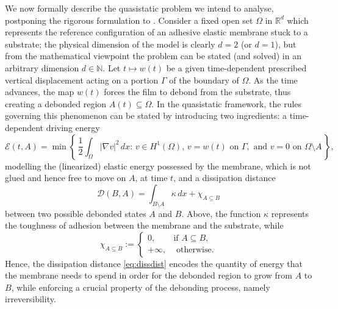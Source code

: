\documentclass[a4paper,11pt,reqno]{amsart}
\numberwithin{equation}{section}
\theoremstyle{definition}
\theoremstyle{remark}
\renewcommand{\r}{\mathbb{R}}
\newcommand{\n}{\mathbb{N}}
\begin{document}
We now formally describe the quasistatic problem we intend to analyse, postponing the rigorous formulation to . Consider a fixed open set $\Omega$ in $\r^d$ which represents the reference configuration of an adhesive elastic membrane stuck to a substrate; the physical dimension of the model is clearly $d=2$ (or $d=1$), but from the mathematical viewpoint the problem can be stated (and solved) in an arbitrary dimension $d\in \n$. Let $t\mapsto w(t)$ be a given time-dependent prescribed vertical displacement acting on a portion $\Gamma$ of the boundary of $\Omega$. As the time advances, the map $w(t)$ forces the film to debond from the substrate, thus creating a debonded region $A(t)\subseteq\Omega$. In the quasistatic framework, the rules governing this phenomenon can be stated by introducing two ingredients: a time-dependent driving energy 
\begin{equation}\label{eq:elastic}
    \mathcal E(t,A)=\min\left\{\, \frac 12\int_\Omega |\nabla v|^2\, dx : \, v\in H^1(\Omega),\,v=w(t)\text{ on }\Gamma,\text{ and }v=0\text{ on }\Omega\setminus A\, \right\},
\end{equation}
modelling the (linearized) elastic energy possessed by the membrane, which is not glued and hence free to move on $A$, at time $t$, and a dissipation distance 
\begin{equation}\label{eq:dissdist}
    \mathcal D(B,A)=\int_{B\setminus A}\kappa\,dx+\chi_{A\subseteq B}
\end{equation}
between two possible debonded states $A$ and $B$. Above, the function $\kappa$ represents the toughness of adhesion between the membrane and the substrate, while
\begin{equation}
    \chi_{A\subseteq B}:=\begin{cases}
        0,&\text{if }A\subseteq B,\\
        +\infty,&\text{ otherwise}.
    \end{cases}
\end{equation}
Hence, the dissipation distance \eqref{eq:dissdist} encodes the quantity of energy that the membrane needs to spend in order for the debonded region to grow from $A$ to $B$, while enforcing a crucial property of the debonding process, namely irreversibility.
\end{document}
